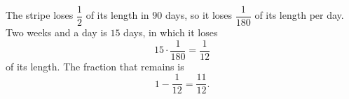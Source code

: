 The stripe loses $\dfrac{1}{2}$ of its length in $90$ days, so it loses $\dfrac{1}{180}$ of its length per day. Two weeks and a day is $15$ days, in which it loses
\[
15\cdot\dfrac{1}{180}=\dfrac{1}{12}
\]
of its length. The fraction that remains is
\[
1-\dfrac{1}{12}=\boxed{\dfrac{11}{12}}.
\]
